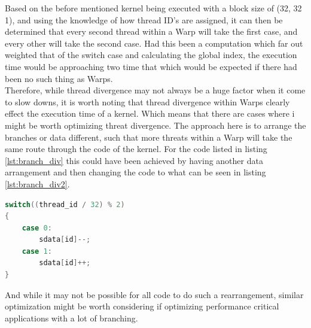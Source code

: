 Based on the before mentioned kernel being executed with a block size of (32, 32 1), and using the knowledge of how thread ID's are assigned, it can then be determined that every second thread within a Warp will take the first case, and every other will take the second case. Had this been a computation which far out weighted that of the switch case and calculating the global index, the execution time would be approaching two time that which would be expected if there had been no such thing as Warps.\\

Therefore, while thread divergence may not always be a huge factor when it come to slow downs, it is worth noting that thread divergence within Warps clearly effect the execution time of a kernel. Which means that there are cases where i might be worth optimizing threat divergence. The approach here is to arrange the branches or data different, such that more threats within a Warp will take the same route through the code of the kernel. For the code listed in listing \ref{lst:branch_div} this could have been achieved by having another data arrangement and then changing the code to what can be seen in listing \ref{lst:branch_div2}.

\begin{lstlisting}[language=C,caption={TBD},label=lst:branch_div2]
switch((thread_id / 32) % 2)
{
	case 0:
		sdata[id]--;
	case 1:
		sdata[id]++;
}
\end{lstlisting} 

And while it may not be possible for all code to do such a rearrangement, similar optimization might be worth considering if optimizing performance critical applications with a lot of branching.